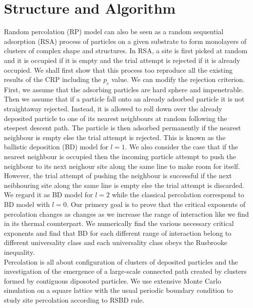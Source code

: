 \section{Structure and Algorithm}
Random percolation (RP) model can also be seen as a random sequential adsorption (RSA) process of particles on a given substrate to form monolayers of clusters of complex shape and structures. In RSA, a site is first picked at random and it is occupied if it is empty and the trial attempt is rejected if it is already occupied. We shall first show that this process too reproduce all the existing results of the CRP including the $p_c$ value. We can modify the rejection criterion. First, we assume that the adsorbing particles are hard sphere and impenetrable. Then we assume that if a particle fall onto an already adsorbed particle it is not straightaway rejected. Instead, it is allowed to roll down over the already deposited particle to one of its nearest neighbours at random following the steepest descent path. The particle is then adsorbed permanently if the nearest neighbour is empty else the trial attempt is rejected. This is known as the ballistic deposition (BD) model for $l = 1$. We also consider the case that if the nearest neighbour is occupied then the incoming particle attempt to push the neighbour to its next neighour site along the same line to make room for itself. However, the trial attempt of pushing the neighbour is successful if the next neibhouring site along the same line is empty else the trial attempt is discarded. We regard it as BD model for $l = 2$ while the classical percolation correspond to BD model with $l = 0$. Our primery goal is to prove that the critical exponents of percolation changes as changes as we increase the range of interaction like we find in its thermal counterpart. We numerically find the various necessary critical exponents and find that BD for each different range of interaction belong to different universality class and each universality class
obeys the Rusbrooke inequality.\\

Percolation is all about configuration of clusters of deposited particles and the investigation of the emergence of a large-scale connected path created by clusters formed by contiguous diposoted particles. We use extensive Monte Carlo simulation on a square lattice with the usual periodic boundary condition to study site percolation according to RSBD rule.\\

